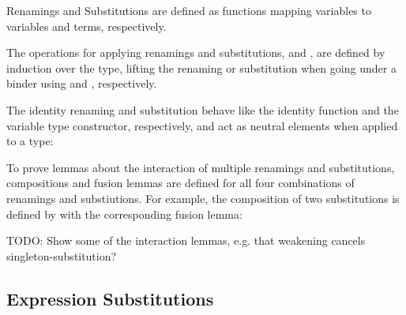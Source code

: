 \documentclass[acmsmall,anonymous,review,screen]{acmart}
\begin{document}
Renamings {\ATRen} and Substitutions {\ATSub} are defined as
functions mapping variables to variables and terms, respectively.

\noindent\hspace{-\fboxsep}
\begin{minipage}{0.5\linewidth}
  \SubDefTRen
\end{minipage}
\begin{minipage}{0.5\linewidth}
  \SubDefTSub
\end{minipage}

The operations for applying renamings and substitutions, {\ATren}
and {\ATsub}, are defined by induction over the type, lifting the
renaming or substitution when going under a binder using
{\ATliftR} and {\ATliftS}, respectively.

\noindent\hspace{-\fboxsep}
\begin{minipage}{0.5\linewidth}
  \SubDefTren
\end{minipage}
\begin{minipage}{0.5\linewidth}
  \SubDefTsub
\end{minipage}

The identity renaming {\ATidR} and substitution
{\ATidS} behave like the identity function and the variable
type constructor, respectively, and act as neutral elements when applied to a type:

\noindent\hspace{-\fboxsep}
\begin{minipage}{0.5\linewidth}
  \SubDefTidR
  \TFTidRNeutral
\end{minipage}
\begin{minipage}{0.5\linewidth}
  \SubDefTidS
  \TFTidSNeutral
\end{minipage}


To prove lemmas about the interaction of multiple renamings and substitutions,
compositions and fusion lemmas are defined for all four combinations
of renamings and substiutions.
For example, the composition of two substitutions is defined by
\SubDefTCompositionSS
with the corresponding fusion lemma:
\TFFusionSubSub

TODO: Show some of the interaction lemmas, e.g. that weakening cancels singleton-substitution?


\subsection{Expression Substitutions}
\label{sec:substitutions:expr}
\end{document}
